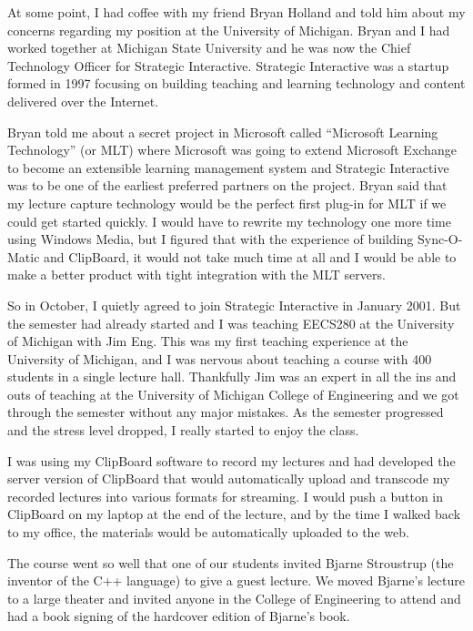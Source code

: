 \documentclass[12pt]{book}
\begin{document}
At some point, I had coffee with my friend Bryan Holland
and told him about my concerns regarding my position at
the University of Michigan.
Bryan and I had worked together at Michigan State University and
he was now the Chief Technology Officer for Strategic Interactive.
Strategic Interactive was a startup formed in 1997 focusing on
building teaching and learning technology and content delivered over the
Internet.

Bryan told me about a secret project in Microsoft called ``Microsoft
Learning Technology'' (or MLT) where Microsoft was going to
extend Microsoft Exchange to become an extensible learning
management system and Strategic Interactive was to be one of
the earliest preferred partners on the project.  Bryan said
that my lecture capture technology would be the perfect
first plug-in for MLT if we could get started quickly.  I
would have to rewrite my technology one more time using
Windows Media, but I figured that with the experience of
building Sync-O-Matic and ClipBoard, it would not take much time
at all and I would be able to make a better product
with tight integration with the MLT servers.

So in October, I quietly agreed to join Strategic Interactive
in January 2001.  But the semester had already started and
I was teaching EECS280 at the University of Michigan with Jim Eng.
This was my first teaching experience at the University of Michigan, and
I was nervous about teaching a course with 400 students
in a single lecture hall.
Thankfully Jim was an expert in all the
ins and outs of teaching at the University of Michigan College of
Engineering and we got through the semester without any major
mistakes.   As the semester progressed and the stress level dropped,
I really started to enjoy the class.

I was using my ClipBoard software to record
my lectures and had developed the server version of ClipBoard
that would automatically upload and transcode my
recorded lectures into various formats for streaming.  I would
push a button in ClipBoard on my laptop at the end of
the lecture, and by the time I walked back to my office, the
materials would be automatically uploaded to the web.

The course went so well that one of our students invited
Bjarne Stroustrup (the inventor of the C++ language)
to give a guest lecture.
We moved Bjarne's lecture to a large theater and
invited anyone in the College of Engineering to attend and
had a book signing of the hardcover edition of Bjarne's book.
\end{document}
